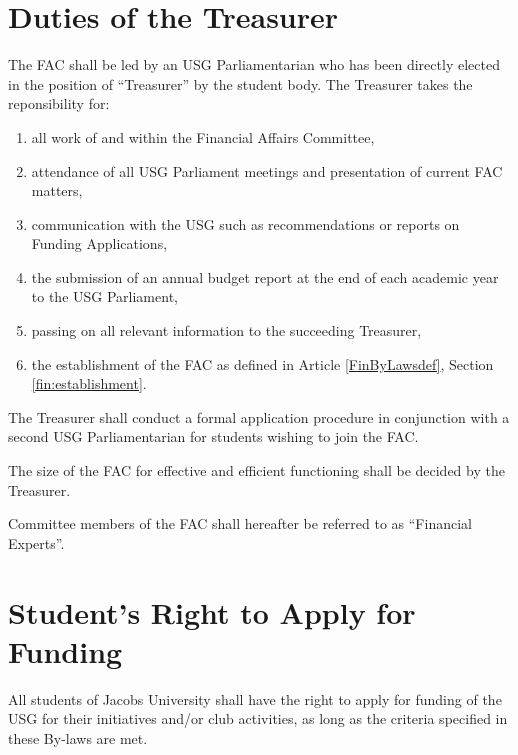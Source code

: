 \section{Duties of the Treasurer}
The FAC shall be led by an USG Parliamentarian who has been directly elected in the position of ``Treasurer'' by the student body. The Treasurer takes the reponsibility for:

\begin{enumerate}
\item all work of and within the Financial Affairs Committee,
\item attendance of all USG Parliament meetings and presentation of current FAC matters,
\item communication with the USG such as recommendations or reports on Funding Applications,
\item the submission of an annual budget report at the end of each academic year to the USG Parliament,
\item passing on all relevant information to the succeeding Treasurer,
\item the establishment of the FAC as defined in Article \ref{FinByLawsdef}, Section \ref{fin:establishment}.
\end{enumerate}

\label{fin:establishment}
\begin{parenum}
\item The Treasurer shall conduct a formal application procedure in conjunction with a second USG Parliamentarian for students wishing to join the FAC.
\item The size of the FAC for effective and efficient functioning shall be decided by the Treasurer. 
\item Committee members of the FAC shall hereafter be referred to as ``Financial Experts''.
\end{parenum}

\section{Student's Right to Apply for Funding}
All students of Jacobs University shall have the right to apply for funding of the USG for their initiatives and/or club activities, as long as the criteria specified in these By-laws are met.

